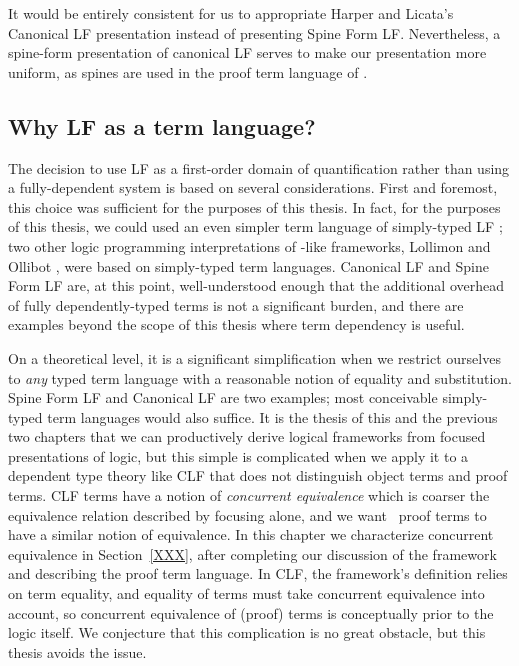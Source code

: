 It would be entirely consistent for us to appropriate Harper and
Licata's Canonical LF presentation instead of presenting Spine Form
LF. Nevertheless, a spine-form presentation of canonical LF serves to
make our presentation more uniform, as spines are used in the proof
term language of \sls.

\subsection{Why LF as a term language?}
\label{sec:why-not-fully-dependent}

The decision to use LF as a first-order domain of quantification
rather than using a fully-dependent system is based on several
considerations. First and foremost, this choice was sufficient for the
purposes of this thesis. In fact, for the purposes of this thesis, we
could used an even simpler term language of simply-typed LF
\cite{pfenning08church}; two other logic programming interpretations
of \sls-like frameworks, Lollimon \cite{lopez05monadic} and Ollibot
\cite{pfenning09substructural}, were based on simply-typed term
languages. Canonical LF and Spine Form LF are, at this point,
well-understood enough that the additional overhead of fully
dependently-typed terms is not a significant burden, and there are
examples beyond the scope of this thesis where term dependency is
useful.

On a theoretical level, it is a significant simplification when we
restrict ourselves to {\it any} typed term language with a reasonable
notion of equality and substitution. Spine Form LF and Canonical LF
are two examples; most conceivable simply-typed term languages would
also suffice. It is the thesis of this and the previous two chapters
that we can productively derive logical frameworks from focused
presentations of logic, but this simple is complicated when we apply it
to a dependent type theory like CLF that does not distinguish object
terms and proof terms. CLF terms have a notion of {\it concurrent
  equivalence} which is coarser the equivalence relation described by
focusing alone, and we want \sls~proof terms to have a similar notion
of equivalence. In this chapter we characterize concurrent equivalence
in Section~\ref{XXX}, after completing our discussion of the framework
and describing the proof term language.  In CLF, the framework's
definition relies on term equality, and equality of terms must take
concurrent equivalence into account, so concurrent equivalence of
(proof) terms is conceptually prior to the logic itself. We conjecture
that this complication is no great obstacle, but this thesis avoids
the issue.

